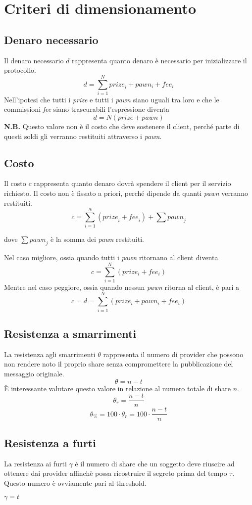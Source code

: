 \section{Criteri di dimensionamento}

\subsection{Denaro necessario}
Il denaro necessario $ d $ rappresenta quanto denaro è necessario per inizializzare
il protocollo.
$$ d = \sum_{i=1}^{N} \textit{prize}_i + pawn_i + fee_i $$
Nell'ipotesi che tutti i \textit{prize} e tutti i \textit{pawn}
siano uguali tra loro e che le commissioni \textit{fee} siano trascurabili
l'espressione diventa
$$ d = N(prize + pawn) $$
\textbf{N.B.} Questo valore non è il costo che deve sostenere il client, perché parte
di questi soldi gli verranno restituiti attraverso i \textit{pawn}.

\subsection{Costo}
Il costo $ c $ rappresenta quanto denaro dovrà spendere il client per il servizio
richiesto. Il costo non è fissato a priori,
perché dipende da quanti \textit{pawn} verranno
restituiti.
$$ c = \sum_{i=1}^{N} (\textit{prize}_i + \textit{fee}_i) + \sum \textit{pawn}_j $$
\begin{flushright}
	dove $ \sum \textit{pawn}_j $ è la somma dei \textit{pawn} restituiti.
\end{flushright}
Nel caso migliore, ossia quando tutti i \textit{pawn} ritornano al client diventa
$$ c = \sum_{i=1}^{N} (prize_i + fee_i) $$
Mentre nel caso peggiore, ossia quando nessun \textit{pawn}
ritorna al client, è pari a
$$ c = d = \sum_{i=1}^{N} (prize_i + pawn_i + fee_i) $$


\subsection{Resistenza a smarrimenti}
La resistenza agli smarrimenti $ \theta $ rappresenta 
il numero di provider che possono non
rendere noto il proprio share senza compromettere la pubblicazione del messaggio
originale.
$$ \theta = n - t $$
È interessante valutare questo valore in relazione
al numero totale di share $ n $.
$$ \theta_r = \frac{n - t}{n} $$
$$ \theta_\% = 100 \cdot \theta_r = 100 \cdot \frac{n - t}{n} $$

\subsection{Resistenza a furti}
\label{subsec:resistenza-a-furti}
La resistenza ai furti $ \gamma $ è il numero di share che un soggetto deve riuscire
ad ottenere dai provider affinchè possa
ricostruire il segreto prima del tempo $ \tau $.
Questo numero è ovviamente pari al threshold.
\begin{center}
	$ \gamma = t $
\end{center}








